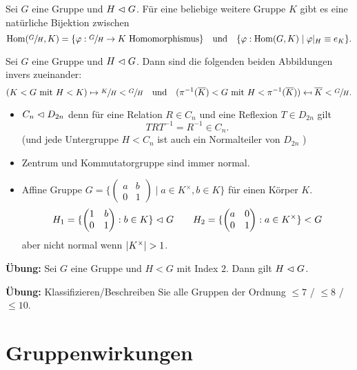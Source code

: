 \begin{corollary}
	Sei $G$ eine Gruppe und $H \vartriangleleft G$.
	Für eine beliebige weitere Gruppe $K$ gibt es eine natürliche Bijektion zwischen 
	\[
		\hom(\sfrac{G}{H},K) = \{ \varphi: \sfrac{G}{H} \to K \text{ Homomorphismus}\} \qq{und} \{\varphi: \hom(G,K) \mid \varphi \vert_{H} \equiv e_{K}\} 
	.\] 
\end{corollary}

\begin{corollary}
	Sei $G$ eine Gruppe und $H \vartriangleleft G$.
	Dann sind die folgenden beiden Abbildungen invers zueinander:
	\[
		(K < G \text{ mit } H < K) \mapsto  \sfrac{K}{H} < \sfrac{G}{H} \qq{und}(\pi^{-1}(\overline{K}) < G \text{ mit } H < \pi^{-1}(\overline{K})) \mapsfrom \overline{K} < \sfrac{G}{H}
	.\] 
\end{corollary}

\begin{eg}
	\begin{itemize}
		\item $C_{n} \vartriangleleft D_{2n}$ denn für eine Relation $R \in C_{n}$ und eine Reflexion $T \in D_{2n}$ gilt
			\[
			T R T^{-1} = R^{-1} \in C_{n}
			.\]
			(und jede Untergruppe $H < C_{n}$ ist auch ein Normalteiler von $D_{2n}$ )
		\item Zentrum und Kommutatorgruppe sind immer normal.
		\item Affine Gruppe $G = \{\begin{pmatrix} 
					a &b \\ 0 & 1
		\end{pmatrix} \mid a \in K^{\times}, b \in K\} $ für einen Körper $K$.
		\[
		H_1 = \{\begin{pmatrix} 
				1 &b\\ 0 &1
		\end{pmatrix} : b \in K\} \vartriangleleft G \qquad H_2 = \{ \begin{pmatrix} 
				a &0\\ 0 &1
		\end{pmatrix} : a \in K^{\times}\} < G
		\]
		aber nicht normal wenn $\abs{K^{\times}} > 1$.
	\end{itemize}
\end{eg}

\textbf{Übung:}
Sei $G$ eine Gruppe und $H < G$ mit Index $2$.
Dann gilt $H \vartriangleleft G$.

\textbf{Übung:} Klassifizieren/Beschreiben Sie alle Gruppen der Ordnung $\leq 7$ / $\leq 8$ / $\leq 10$.

\section{Gruppenwirkungen}

